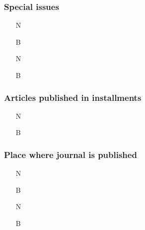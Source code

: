 \documentclass[11pt,letterpaper,oneside]{article}
\begin{document}
\setcounter{subsubsection}{186}
\subsubsection{Special issues}
\label{14.187}


\begin{itemize}
\item[N] 

\item[B] 

\item[N] 

\item[B] 
\end{itemize}

\setcounter{subsubsection}{188}
\subsubsection{Articles published in installments}


\begin{itemize}
\item[N] 

\item[B] 
\end{itemize}

\setcounter{subsubsection}{190}
\subsubsection{Place where journal is published}

\begin{itemize}
\item[N] 

\item[B] 

\item[N] 

\item[B] 
\end{itemize}
\end{document}
